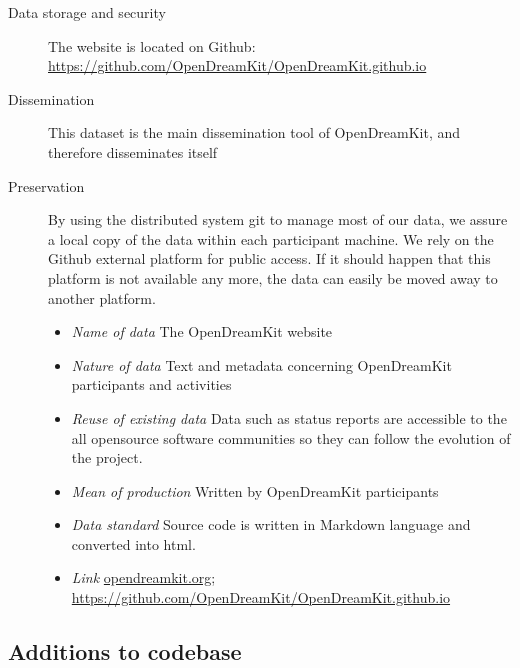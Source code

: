 \documentclass{deliverablereport}
\begin{document}
\begin{description}
\item[Data storage and security] The website is located on Github: \href{https://github.com/OpenDreamKit/OpenDreamKit.github.io}{https://github.com/OpenDreamKit/OpenDreamKit.github.io}
\item[Dissemination] This dataset is the main dissemination tool of OpenDreamKit, and therefore disseminates itself
\item[Preservation] By using the distributed system git to manage most of our data, we assure a local copy of the data within each participant machine. We rely on the Github external platform for public access. If it should happen that this platform is not available any more, the data can easily be moved away to another platform.
\begin{itemize}
\item\textit{Name of data} The OpenDreamKit website
\item\textit{Nature of data} Text and metadata concerning OpenDreamKit participants and activities
\item\textit{Reuse of existing data} Data such as status reports are accessible to the all opensource software communities so they can follow the evolution of the project. 
\item\textit{Mean of production} Written by OpenDreamKit participants
\item\textit{Data standard} Source code is written in Markdown language and converted into html.
\item\textit{Link} \href{http://opendreamkit.org/}{opendreamkit.org}; \href{https://github.com/OpenDreamKit/OpenDreamKit.github.io}{https://github.com/OpenDreamKit/OpenDreamKit.github.io}
\end{itemize}
\end{description}

\subsection{Additions to \Sage codebase}
\end{document}
